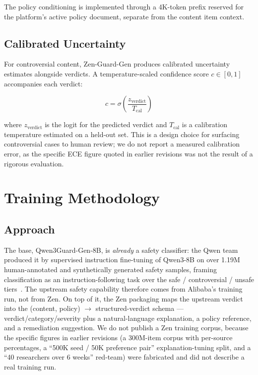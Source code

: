 \documentclass[11pt,a4paper]{article}
\begin{document}
The policy conditioning is implemented through a 4K-token prefix reserved for the platform's active policy document, separate from the content item context.

\subsection{Calibrated Uncertainty}

For controversial content, Zen-Guard-Gen produces calibrated uncertainty estimates alongside verdicts. A temperature-scaled confidence score $c \in [0,1]$ accompanies each verdict:

\begin{equation}
  c = \sigma\left(\frac{z_{\text{verdict}}}{T_{\text{cal}}}\right)
\end{equation}

where $z_{\text{verdict}}$ is the logit for the predicted verdict and $T_{\text{cal}}$ is a calibration temperature estimated on a held-out set. This is a design choice for surfacing controversial cases to human review; we do not report a measured calibration error, as the specific ECE figure quoted in earlier revisions was not the result of a rigorous evaluation.

\section{Training Methodology}

\subsection{Approach}

The base, Qwen3Guard-Gen-8B, is \emph{already} a safety classifier: the Qwen team produced it
by supervised instruction fine-tuning of Qwen3-8B on over 1.19M human-annotated and
synthetically generated safety samples, framing classification as an
instruction-following task over the safe / controversial / unsafe tiers~\cite{qwen3guard}. The
upstream safety capability therefore comes from Alibaba's training run, not from Zen. On top of
it, the Zen packaging maps the upstream verdict into the (content, policy)
$\rightarrow$ structured-verdict schema --- verdict/category/severity plus a natural-language
explanation, a policy reference, and a remediation suggestion. We do not publish a Zen
training corpus, because the specific figures in earlier revisions (a 300M-item corpus with
per-source percentages, a ``500K seed / 50K preference pair'' explanation-tuning split, and a
``40 researchers over 6 weeks'' red-team) were fabricated and did not describe a real training
run.
\end{document}
